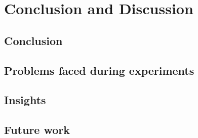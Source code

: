 \documentclass[12pt]{article}
\begin{document}
\section{Conclusion and Discussion}
\subsection{Conclusion}
\subsection{Problems faced during experiments}
\subsection{Insights}
\subsection{Future work}
\newpage
\end{document}

